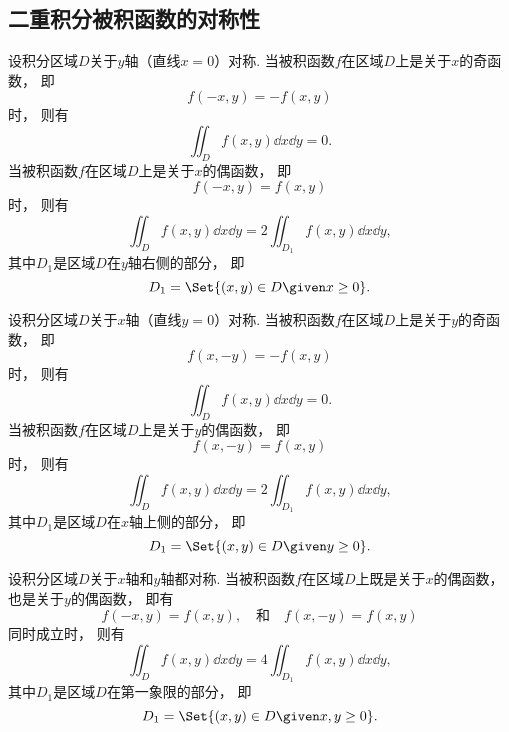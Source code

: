 \subsection{二重积分被积函数的对称性}
\begingroup

设积分区域\(D\)关于\(y\)轴（直线\(x=0\)）对称.
当被积函数\(f\)在区域\(D\)上是关于\(x\)的奇函数，
即\begin{equation*}
	f(-x,y) = -f(x,y)
\end{equation*}时，
则有\begin{equation*}
	\iint_D f(x,y) \dd{x}\dd{y} = 0.
\end{equation*}
当被积函数\(f\)在区域\(D\)上是关于\(x\)的偶函数，
即\begin{equation*}
	f(-x,y) = f(x,y)
\end{equation*}时，
则有\begin{equation*}
	\iint_D f(x,y) \dd{x}\dd{y} = 2 \iint_{D_1} f(x,y) \dd{x}\dd{y},
\end{equation*}
其中\(D_1\)是区域\(D\)在\(y\)轴右侧的部分，
即\begin{equation*}
	D_1 = \Set{ (x,y) \in D \given x\geq0 }.
\end{equation*}

设积分区域\(D\)关于\(x\)轴（直线\(y=0\)）对称.
当被积函数\(f\)在区域\(D\)上是关于\(y\)的奇函数，
即\begin{equation*}
	f(x,-y) = -f(x,y)
\end{equation*}时，
则有\begin{equation*}
	\iint_D f(x,y) \dd{x}\dd{y} = 0.
\end{equation*}
当被积函数\(f\)在区域\(D\)上是关于\(y\)的偶函数，
即\begin{equation*}
	f(x,-y) = f(x,y)
\end{equation*}时，
则有\begin{equation*}
	\iint_D f(x,y) \dd{x}\dd{y} = 2 \iint_{D_1} f(x,y) \dd{x}\dd{y},
\end{equation*}
其中\(D_1\)是区域\(D\)在\(x\)轴上侧的部分，
即\begin{equation*}
	D_1 = \Set{ (x,y) \in D \given y\geq0 }.
\end{equation*}

设积分区域\(D\)关于\(x\)轴和\(y\)轴都对称.
当被积函数\(f\)在区域\(D\)上既是关于\(x\)的偶函数，也是关于\(y\)的偶函数，
即有\begin{equation*}
	f(-x,y) = f(x,y),
	\quad\text{和}\quad
	f(x,-y) = f(x,y)
\end{equation*}同时成立时，
则有\begin{equation*}
	\iint_D f(x,y) \dd{x}\dd{y}
	= 4 \iint_{D_1} f(x,y) \dd{x}\dd{y},
\end{equation*}
其中\(D_1\)是区域\(D\)在第一象限的部分，
即\begin{equation*}
	D_1 = \Set{ (x,y) \in D \given x,y\geq0 }.
\end{equation*}


